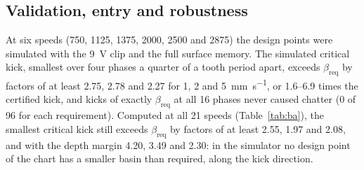 
\subsection{Validation, entry and robustness}\label{sec:ba-valid}

At six speeds (750, 1125, 1375, 2000, 2500 and \SI{2875}{\rpm}) the design points were simulated with the \SI{9}{\volt} clip and the full surface memory. The simulated critical kick, smallest over four phases a quarter of a tooth period apart, exceeds $\beta_{\mathrm{req}}$ by factors of at least 2.75, 2.78 and 2.27 for 1, 2 and \SI{5}{\milli\metre\per\second}, or 1.6--6.9 times the certified kick, and kicks of exactly $\beta_{\mathrm{req}}$ at all 16 phases never caused chatter (0 of 96 for each requirement). Computed at all 21 speeds (Table~\ref{tab:ba}), the smallest critical kick still exceeds $\beta_{\mathrm{req}}$ by factors of at least 2.55, 1.97 and 2.08, and with the depth margin 4.20, 3.49 and 2.30: in the simulator no design point of the chart has a smaller basin than required, along the kick direction.

